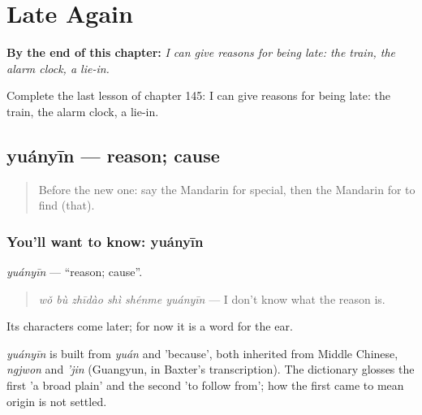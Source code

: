 
\chapter{Late Again}
\label{ch:zh-late-again}

\begin{chapteropening}
\textbf{By the end of this chapter:} \emph{I can give reasons for being late: the train, the alarm clock, a lie-in.}

Complete the last lesson of chapter 145: I can give reasons for being late: the train, the alarm clock, a lie-in.
\end{chapteropening}

\section[yuányīn]{yuányīn — reason; cause}

\label{lesson:ZH-C145-yuanyin}



\begin{quote}
Before the new one: say the Mandarin for special, then the Mandarin for to find (that).
\end{quote}

\subsection*{You'll want to know: yuányīn}
\emph{yuányīn} — \textquotedblleft{}reason; cause\textquotedblright{}.

\begin{quote}
\emph{wǒ bù zhīdào shì shénme yuányīn} — I don't know what the reason is.
\end{quote}

Its characters come later; for now it is a word for the ear.

\begin{cousinweb}
\emph{yuányīn} is built from \emph{yuán} and  'because', both inherited from Middle Chinese, \emph{ngjwon} and \emph{'jin} (Guangyun, in Baxter's transcription). The dictionary glosses the first 'a broad plain' and the second 'to follow from'; how the first came to mean origin is not settled.
\end{cousinweb}


